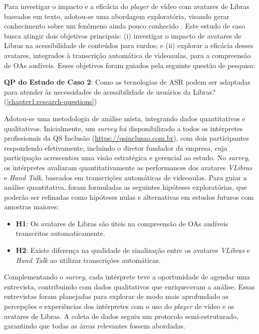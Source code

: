 Para investigar o impacto e a eficácia do \textit{player} de vídeo com avatares de Libras baseados em texto, adotou-se uma abordagem exploratória, visando gerar conhecimento sobre um fenômeno ainda pouco conhecido \cite{CastroFilho2021}. Este estudo de caso busca atingir dois objetivos principais: (i) investigar o impacto de avatares de Libras na acessibilidade de conteúdos para surdos; e (ii) explorar a eficácia desses avatares, integrados à transcrição automática de videoaulas, para a compreensão de OAs audíveis. Esses objetivos foram guiados pela seguinte questão de pesquisa:

\begin{citacao}
\textbf{QP do Estudo de Caso 2}: Como as tecnologias de ASR podem ser adaptadas para atender às necessidades de acessibilidade de usuários da Libras? (\autoref{chapter1:research-questions})
\end{citacao}

Adotou-se uma metodologia de análise mista, integrando dados quantitativos e qualitativos. Inicialmente, um \textit{survey} foi disponibilizado a todos os intérpretes profissionais da QS Inclusão (\url{https://qsinclusao.com.br}), com dois participantes respondendo efetivamente, incluindo o diretor fundador da empresa, cuja participação acrescentou uma visão estratégica e gerencial ao estudo. No \textit{survey}, os intérpretes avaliaram quantitativamente as performances dos avatares \textit{VLibras} e \textit{Hand Talk}, baseados em transcrições automáticas de videoaulas. Para guiar a análise quantitativa, foram formuladas as seguintes hipóteses exploratórias, que poderão ser refinadas como hipóteses nulas e alternativas em estudos futuros com amostras maiores:

\begin{itemize}
\item \textbf{H1}: Os avatares de Libras são úteis na compreensão de OAs audíveis transcritos automaticamente.
\item \textbf{H2}: Existe diferença na qualidade de sinalização entre os avatares \textit{VLibras} e \textit{Hand Talk} ao utilizar transcrições automáticas.
\end{itemize}

Complementando o \textit{survey}, cada intérprete teve a oportunidade de agendar uma entrevista, contribuindo com dados qualitativos que enriqueceram a análise. Essas entrevistas foram planejadas para explorar de modo mais aprofundado as percepções e experiências dos intérpretes com o uso do \textit{player} de vídeo e os avatares de Libras. A coleta de dados seguiu um protocolo semi-estruturado, garantindo que todas as áreas relevantes fossem abordadas.

